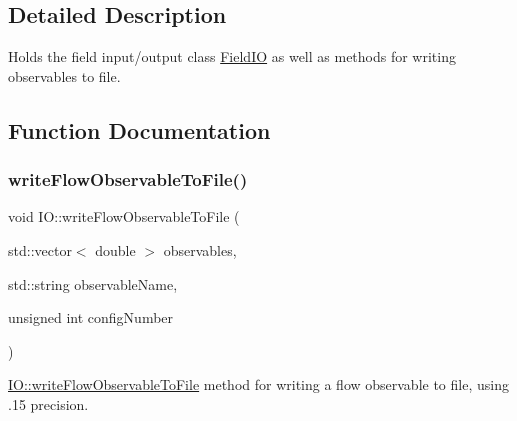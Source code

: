 \subsection{Detailed Description}
Holds the field input/output class \mbox{\hyperlink{class_i_o_1_1_field_i_o}{Field\+IO}} as well as methods for writing observables to file. 

\subsection{Function Documentation}
\mbox{\label{namespace_i_o_a4f554804fd2ccd9c13c73777c5cbbf77}} 
\subsubsection{\texorpdfstring{writeFlowObservableToFile()}{writeFlowObservableToFile()}}
{\footnotesize\ttfamily void I\+O\+::write\+Flow\+Observable\+To\+File (\begin{DoxyParamCaption}\item[{std\+::vector$<$ double $>$}]{observables,  }\item[{std\+::string}]{observable\+Name,  }\item[{unsigned int}]{config\+Number }\end{DoxyParamCaption})}



\mbox{\hyperlink{namespace_i_o_a4f554804fd2ccd9c13c73777c5cbbf77}{I\+O\+::write\+Flow\+Observable\+To\+File}} method for writing a flow observable to file, using .15 precision. 


